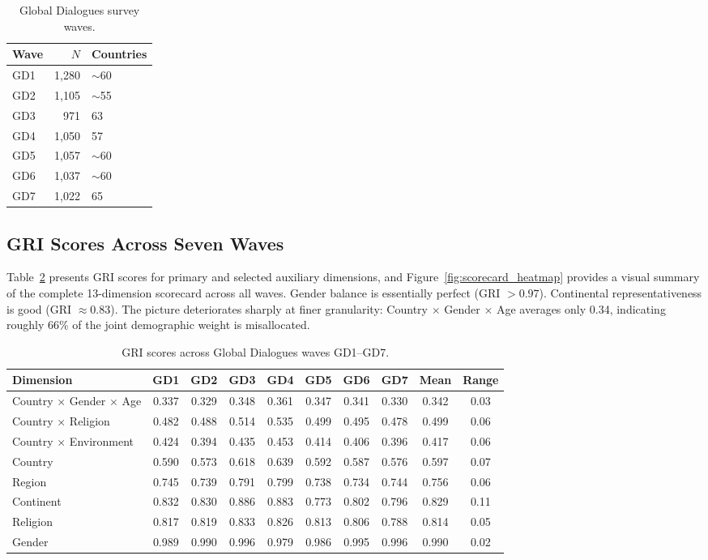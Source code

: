 \documentclass[11pt,a4paper]{article}
\begin{document}
\begin{table}[ht]
\centering
\caption{Global Dialogues survey waves.}
\label{tab:gd_waves}
\begin{tabular}{@{}lrl@{}}
\toprule
Wave & $N$ & Countries \\
\midrule
GD1 & 1,280 & $\sim$60 \\
GD2 & 1,105 & $\sim$55 \\
GD3 & 971 & 63 \\
GD4 & 1,050 & 57 \\
GD5 & 1,057 & $\sim$60 \\
GD6 & 1,037 & $\sim$60 \\
GD7 & 1,022 & 65 \\
\bottomrule
\end{tabular}
\end{table}

\subsection{GRI Scores Across Seven Waves}

Table~\ref{tab:gri_scores} presents GRI scores for primary and selected auxiliary dimensions, and Figure~\ref{fig:scorecard_heatmap} provides a visual summary of the complete 13-dimension scorecard across all waves. Gender balance is essentially perfect (GRI $> 0.97$). Continental representativeness is good (GRI $\approx 0.83$). The picture deteriorates sharply at finer granularity: Country $\times$ Gender $\times$ Age averages only 0.34, indicating roughly 66\% of the joint demographic weight is misallocated.

\begin{table}[ht]
\centering
\caption{GRI scores across Global Dialogues waves GD1--GD7.}
\label{tab:gri_scores}
\begin{tabular}{@{}lccccccccc@{}}
\toprule
Dimension & GD1 & GD2 & GD3 & GD4 & GD5 & GD6 & GD7 & Mean & Range \\
\midrule
Country $\times$ Gender $\times$ Age & 0.337 & 0.329 & 0.348 & 0.361 & 0.347 & 0.341 & 0.330 & 0.342 & 0.03 \\
Country $\times$ Religion & 0.482 & 0.488 & 0.514 & 0.535 & 0.499 & 0.495 & 0.478 & 0.499 & 0.06 \\
Country $\times$ Environment & 0.424 & 0.394 & 0.435 & 0.453 & 0.414 & 0.406 & 0.396 & 0.417 & 0.06 \\
Country & 0.590 & 0.573 & 0.618 & 0.639 & 0.592 & 0.587 & 0.576 & 0.597 & 0.07 \\
Region & 0.745 & 0.739 & 0.791 & 0.799 & 0.738 & 0.734 & 0.744 & 0.756 & 0.06 \\
Continent & 0.832 & 0.830 & 0.886 & 0.883 & 0.773 & 0.802 & 0.796 & 0.829 & 0.11 \\
Religion & 0.817 & 0.819 & 0.833 & 0.826 & 0.813 & 0.806 & 0.788 & 0.814 & 0.05 \\
Gender & 0.989 & 0.990 & 0.996 & 0.979 & 0.986 & 0.995 & 0.996 & 0.990 & 0.02 \\
\bottomrule
\end{tabular}
\end{table}
\end{document}
